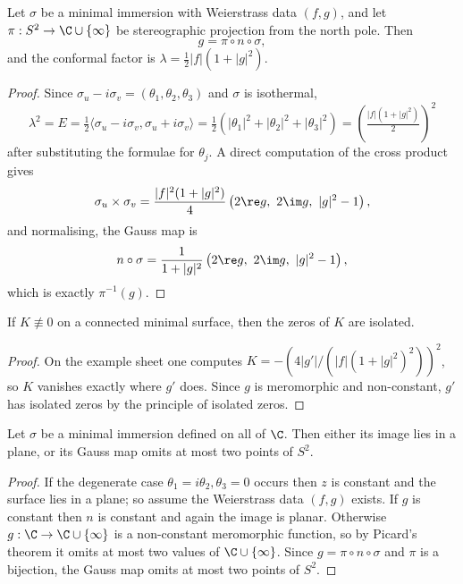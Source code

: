 \begin{proposition}
    Let $\sigma$ be a minimal immersion with Weierstrass data $(f,g)$, and let $\pi: S^2 \rightarrow \C\cup\{\infty\}$ be stereographic projection from the north pole. Then
    $$
    g = \pi \circ n \circ \sigma,
    $$
    and the conformal factor is $\lambda = \tfrac12|f|\left(1+|g|^2\right)$.
\end{proposition}
\begin{proof}
    Since $\sigma_u - i\sigma_v = (\theta_1,\theta_2,\theta_3)$ and $\sigma$ is isothermal,
    $$
    \lambda^2 = E = \tfrac12\langle \sigma_u - i\sigma_v, \sigma_u+i\sigma_v\rangle = \tfrac12\left(|\theta_1|^2+|\theta_2|^2+|\theta_3|^2\right) = \left(\tfrac{|f|(1+|g|^2)}{2}\right)^2
    $$
    after substituting the formulae for $\theta_j$. A direct computation of the cross product gives
    $$
    \sigma_u\times\sigma_v = \frac{|f|^2(1+|g|^2)}{4}\left(2\re g,\ 2\im g,\ |g|^2-1\right),
    $$
    and normalising, the Gauss map is
    $$
    n\circ\sigma = \frac{1}{1+|g|^2}\left(2\re g,\ 2\im g,\ |g|^2-1\right),
    $$
    which is exactly $\pi^{-1}(g)$.
\end{proof}

\begin{corollary}
    If $K \not\equiv 0$ on a connected minimal surface, then the zeros of $K$ are isolated.
\end{corollary}
\begin{proof}
    On the example sheet one computes $K = -\left(4|g'|/\left(|f|(1+|g|^2)^2\right)\right)^2$, so $K$ vanishes exactly where $g' $ does. Since $g$ is meromorphic and non-constant, $g'$ has isolated zeros by the principle of isolated zeros.
\end{proof}

\begin{theorem}
    Let $\sigma$ be a minimal immersion defined on all of $\C$. Then either its image lies in a plane, or its Gauss map omits at most two points of $S^2$.
\end{theorem}
\begin{proof}
    If the degenerate case $\theta_1 = i\theta_2, \theta_3 = 0$ occurs then $z$ is constant and the surface lies in a plane; so assume the Weierstrass data $(f,g)$ exists. If $g$ is constant then $n$ is constant and again the image is planar. Otherwise $g: \C \rightarrow \C\cup\{\infty\}$ is a non-constant meromorphic function, so by Picard's theorem it omits at most two values of $\C\cup\{\infty\}$. Since $g = \pi\circ n\circ\sigma$ and $\pi$ is a bijection, the Gauss map omits at most two points of $S^2$.
\end{proof}

